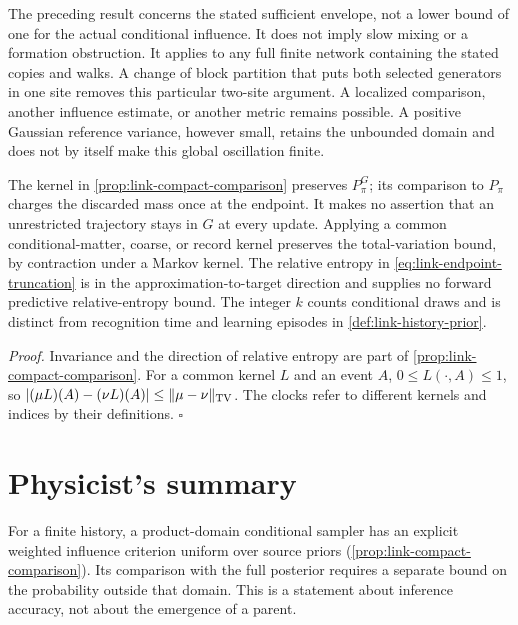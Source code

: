 The preceding result concerns the stated sufficient envelope, not a lower
bound of one for the actual conditional influence. It does not imply slow
mixing or a formation obstruction. It applies to any full finite network
containing the stated copies and walks. A change of block partition that puts
both selected generators in one site removes this particular two-site
argument. A localized comparison, another influence estimate, or another
metric remains possible. A positive Gaussian reference variance, however
small, retains the unbounded domain and does not by itself make this global
oscillation finite. 

The kernel in \cref{prop:link-compact-comparison} preserves $P_\pi^G$; its
comparison to $P_\pi$ charges the discarded mass once at the endpoint. It makes
no assertion that an unrestricted trajectory stays in $G$ at every update.
Applying a common conditional-matter, coarse, or record kernel preserves the
total-variation bound, by contraction under a Markov kernel. The relative entropy
in \cref{eq:link-endpoint-truncation} is in the approximation-to-target direction
and supplies no forward predictive relative-entropy bound. The integer $k$
counts conditional draws and is distinct from recognition time and learning
episodes in \cref{def:link-history-prior}. 

\noindent\emph{Proof.}
Invariance and the direction of relative entropy are part of
\cref{prop:link-compact-comparison}. For a common kernel $L$ and an event $A$,
$0\le L(\cdot,A)\le1$, so
$|(\mu L)(A)-(\nu L)(A)|\le\|\mu-\nu\|_{\rm TV}$.
The clocks refer to different kernels and indices by their definitions.
$\square$

\section*{Physicist's summary}

For a finite history, a product-domain conditional sampler has an explicit
weighted influence criterion uniform over source priors
(\cref{prop:link-compact-comparison}). Its comparison with the full posterior
requires a separate bound on the probability outside that domain. This is a
statement about inference accuracy, not about the emergence of a parent.

